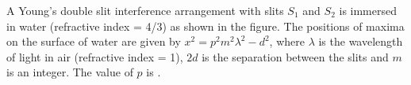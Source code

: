 

    \item A Young's double slit interference arrangement with slits $S_1$ and $S_2$ is immersed in water (refractive index = 4/3) as shown in the figure. The positions of maxima on the surface of water are given by $x^2 = p^2m^2\lambda^2 - d^2$, where $\lambda$ is the wavelength of light in air (refractive index = 1), $2d$ is the separation between the slits and $m$ is an integer. The value of $p$ is \underline{\hspace{2.5 cm}}.
    \begin{center}
    \end{center}

